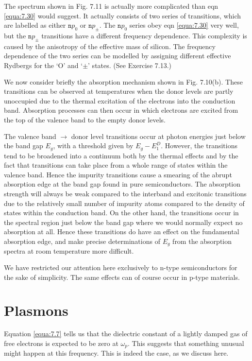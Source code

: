 \documentclass[12pt]{book}
\begin{document}
{The spectrum shown in Fig. 7.11 is actually more complicated than eqn \ref{equa:7.30} would suggest. It actually consists of two series of transitions, which are labelled as either $\texttt{n}p_0$ or $\texttt{n}p_{\pm}$. The $\texttt{n}p_0$ series obey eqn \ref{equa:7.30} very well, but the $\texttt{n}p_{\pm}$ transitions have a different frequency dependence. This complexity is caused by the anisotropy of the effective mass of silicon. The frequency dependence of the two series can be modelled by assigning different effective Rydbergs for the `O' and `$\pm$' states. (See Exercise 7.13.)

We now consider briefly the absorption mechanism shown in Fig. 7.10(b). These transitions can be observed at temperatures when the donor levels are partly unoccupied due to the thermal excitation of the electrons into the conduction band. Absorption processes can then occur in which electrons are excited from the top of the valence band to the empty donor levels.

The valence band $\rightarrow$ donor level transitions occur at photon energies just below the band gap $E_g$, with a threshold given by $E_g - E_1^D$. However, the transitions tend to be broadened into a continuum both by the thermal effects and by the fact that transitions can take place from a whole range of states within the valence band. Hence the impurity transitions cause a smearing of the abrupt absorption edge at the band gap found in pure semiconductors. The absorption strength will always be weak compared to the interband and excitonic transitions due to the relatively small number of impurity atoms compared to the density of states within the conduction band. On the other hand, the transitions occur in the spectral region just below the band gap where we would normally expect no absorption at all. Hence these transitions do have an effect on the fundamental absorption edge, and make precise determinations of $E_g$ from the absorption spectra at room temperature more difficult.

We have restricted our attention here exclusively to n-type semiconductors for the sake of simplicity. The same effects can of course occur in p-type materials.

\section{Plasmons}
Equation \ref{equa:7.7} tells us that the dielectric constant of a lightly damped gas of free electrons is expected to be zero at $\omega_p$. This suggests that something unusual might happen at this frequency. This is indeed the case, as we discuss here.

}
\end{document}
